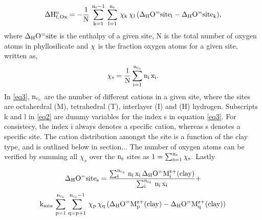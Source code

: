 \documentclass[11pt]{article} %
\begin{document}
\begin{equation}
\rm \Delta H_{f,Ox}^o = -\frac{1}{N}\,\sum_{k=1}^{n_s-1}\,\sum_{l=1}^{n_s}\,\chi_k\,\chi_l\,(\Delta_HO^=site_l-\Delta_HO^=site_k),
\label{eq2}
\end{equation}
where $\rm \Delta_HO^=site$ is the enthalpy of a given site, N is the total number of oxygen atoms in phyllosilicate and $\rm \chi$ is the fraction oxygen atoms for a given site, written as, 
\begin{equation}
\rm \chi_s = \frac{1}{N}\sum_{i=1}^{n_{c_s}} n_i\,x_i.
\label{eq3}
\end{equation}
In \ref{eq3}, $\rm n_{c_s}$ are the number of different cations in a given site, where the sites are octaherdral (M), tetrahedral (T), interlayer (I) and (H) hydrogen. Subscripts k and l in \ref{eq2} are dummy variables for the index s in equation \ref{eq3}. For consistecy, the index i always denotes a specific cation, whereas s denotes a specific site. The cation distribution amongst the site is a function of the clay type, and is outlined below in section... The number of oxygen atoms can be verified by summing all $\chi_s$ over the $\rm n_s$ sites as $\rm 1 = \sum_{s=1}^{n_s}\chi_s$. Lastly 

\begin{equation}
\rm \Delta_HO^=site_s = \frac{\sum_{i}^{n_{c_s}}\,n_i\,x_i\,\Delta_HO^=M_i^{z+}(clay)}{\sum_{i}^{n_{c_s}}\,n_i\,x_i} +
\end{equation}
\begin{equation}
\rm k_{mix}\,\sum_{p=1}^{n_{c_s}}\,\sum_{q=p+1}^{n_{c_s}-1}\,\chi_p\,\chi_q\,(\Delta_HO^=M_p^{z+}(clay)-\Delta_HO^=M_q^{z+}(clay))
\end{equation}
\end{document}
